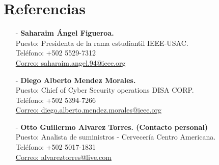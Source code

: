 \documentclass[]{twentysecondcv}
\begin{document}
\section{Referencias}

\begin{itemize}


	\item[-] \textbf{Saharaim \'Angel Figueroa.}\\
		Puesto: Presidenta de la rama estudiantil IEEE-USAC.\\
		Tel\'efono: +502 5529-7312\\
		\href{saharaim.angel.94@ieee.org}{Correo: saharaim.angel.94@ieee.org}\\




	\item[-] \textbf{Diego Alberto Mendez Morales.}\\
		Puesto: Chief of Cyber Security operations DISA CORP.\\
		Tel\'efono: +502 5394-7266\\
		\href{diego.alberto.mendez.morales@ieee.org}{Correo: diego.alberto.mendez.morales@ieee.org}\\




	\item[-] \textbf{Otto Guillermo Alvarez Torres. (Contacto personal)}\\
		Puesto: Analista de suministros - Cervecer\'ia Centro Americana.\\
		Tel\'efono: +502 5017-1831\\
		\href{alvareztorres@live.com}{Correo: alvareztorres@live.com}\\


\end{itemize}



\end{document}
